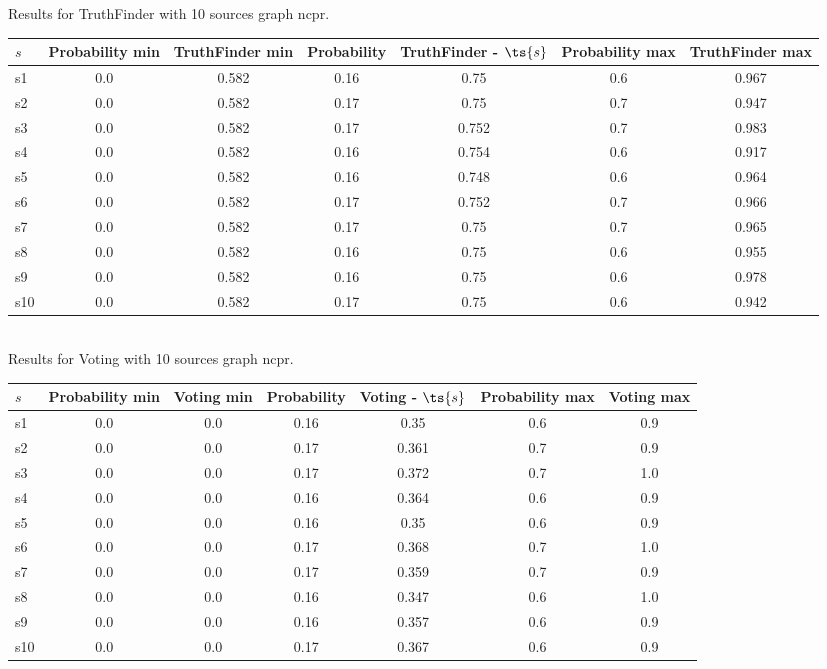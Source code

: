 \documentclass{article}
\begin{document}
\noindent Results for TruthFinder with 10 sources graph ncpr.

\noindent\begin{tabular}{|l|c|c|c|c|c|c|}
\hline
$s$& Probability min & TruthFinder min & Probability & TruthFinder - $\ts{s}$ & Probability max & TruthFinder max\\
\hline
s1 &0.0 & 0.582 & 0.16 & 0.75 & 0.6 & 0.967\\
\hline
s2 &0.0 & 0.582 & 0.17 & 0.75 & 0.7 & 0.947\\
\hline
s3 &0.0 & 0.582 & 0.17 & 0.752 & 0.7 & 0.983\\
\hline
s4 &0.0 & 0.582 & 0.16 & 0.754 & 0.6 & 0.917\\
\hline
s5 &0.0 & 0.582 & 0.16 & 0.748 & 0.6 & 0.964\\
\hline
s6 &0.0 & 0.582 & 0.17 & 0.752 & 0.7 & 0.966\\
\hline
s7 &0.0 & 0.582 & 0.17 & 0.75 & 0.7 & 0.965\\
\hline
s8 &0.0 & 0.582 & 0.16 & 0.75 & 0.6 & 0.955\\
\hline
s9 &0.0 & 0.582 & 0.16 & 0.75 & 0.6 & 0.978\\
\hline
s10 &0.0 & 0.582 & 0.17 & 0.75 & 0.6 & 0.942\\
\hline
\end{tabular}\\

\noindent Results for Voting with 10 sources graph ncpr.

\noindent\begin{tabular}{|l|c|c|c|c|c|c|}
\hline
$s$& Probability min & Voting min & Probability & Voting - $\ts{s}$ & Probability max & Voting max\\
\hline
s1 &0.0 & 0.0 & 0.16 & 0.35 & 0.6 & 0.9\\
\hline
s2 &0.0 & 0.0 & 0.17 & 0.361 & 0.7 & 0.9\\
\hline
s3 &0.0 & 0.0 & 0.17 & 0.372 & 0.7 & 1.0\\
\hline
s4 &0.0 & 0.0 & 0.16 & 0.364 & 0.6 & 0.9\\
\hline
s5 &0.0 & 0.0 & 0.16 & 0.35 & 0.6 & 0.9\\
\hline
s6 &0.0 & 0.0 & 0.17 & 0.368 & 0.7 & 1.0\\
\hline
s7 &0.0 & 0.0 & 0.17 & 0.359 & 0.7 & 0.9\\
\hline
s8 &0.0 & 0.0 & 0.16 & 0.347 & 0.6 & 1.0\\
\hline
s9 &0.0 & 0.0 & 0.16 & 0.357 & 0.6 & 0.9\\
\hline
s10 &0.0 & 0.0 & 0.17 & 0.367 & 0.6 & 0.9\\
\hline
\end{tabular}\\
\end{document}
